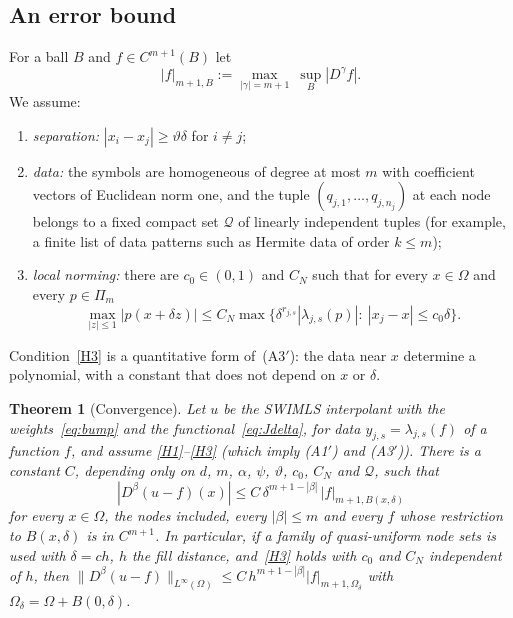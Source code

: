 \documentclass[12pt]{amsart}
\newtheorem{theorem}{Theorem}[section]
\theoremstyle{definition}
\theoremstyle{remark}
\newcommand{\Pm}{\Pi_m}
\begin{document}
\subsection{An error bound}
For a ball $B$ and $f\in C^{m+1}(B)$ let
\[
  |f|_{m+1,B}:=\max_{|\gamma|=m+1}\ \sup_B|D^\gamma f| .
\]
We assume:
\begin{enumerate}[label=(H\arabic*)]
  \item\label{H1} \emph{separation:} $|x_i-x_j|\ge\vartheta\delta$ for $i\ne j$;
  \item\label{H2} \emph{data:} the symbols are homogeneous of degree at most $m$ with coefficient
        vectors of Euclidean norm one, and the tuple $(q_{j,1},\dots,q_{j,n_j})$ at each node
        belongs to a fixed compact set $\mathcal Q$ of linearly independent tuples (for
        example, a finite list of data patterns such as Hermite data of order $k\le m$);
  \item\label{H3} \emph{local norming:} there are $c_0\in(0,1)$ and $C_N$ such that for every
        $x\in\Omega$ and every $p\in\Pm$
        \[
          \max_{|z|\le1}|p(x+\delta z)|\le C_N\max\bigl\{\delta^{r_{j,s}}|\lambda_{j,s}(p)|:\
          |x_j-x|\le c_0\delta\bigr\}.
        \]
\end{enumerate}
Condition~\ref{H3} is a quantitative form of~(A3$'$): the data near $x$ determine a polynomial,
with a constant that does not depend on $x$ or $\delta$.

\begin{theorem}[Convergence]\label{thm:convergence}
Let $u$ be the SWIMLS interpolant with the weights~\eqref{eq:bump} and the
functional~\eqref{eq:Jdelta}, for data $y_{j,s}=\lambda_{j,s}(f)$ of a function $f$, and assume
\ref{H1}--\ref{H3} (which imply (A1$'$) and (A3$'$)). There is a constant $C$, depending only on $d$, $m$, $\alpha$, $\psi$,
$\vartheta$, $c_0$, $C_N$ and $\mathcal Q$, such that
\begin{equation}\label{eq:convergence}
  |D^\beta(u-f)(x)|\le C\,\delta^{m+1-|\beta|}\,|f|_{m+1,B(x,\delta)}
\end{equation}
for every $x\in\Omega$, the nodes included, every $|\beta|\le m$ and every $f$ whose
restriction to $B(x,\delta)$ is in $C^{m+1}$. In particular, if a family of quasi-uniform node
sets is used with $\delta=ch$, $h$ the fill distance, and~\ref{H3} holds with $c_0$ and $C_N$
independent of $h$, then
$\|D^\beta(u-f)\|_{L^\infty(\Omega)}\le C\,h^{m+1-|\beta|}|f|_{m+1,\Omega_\delta}$ with
$\Omega_\delta=\Omega+B(0,\delta)$.
\end{theorem}
\end{document}

